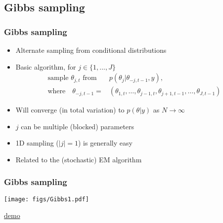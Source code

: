 \documentclass[10pt]{beamer}
\begin{document}
\subsection{Gibbs sampling}

\begin{frame}

\frametitle{Gibbs sampling}

  \begin{itemize}
  \item Alternate sampling from conditional distributions
  \item Basic algorithm, for $j \in \{1,...,J\}$ {
      \begin{align*}
         \text{sample $\theta_{j,t}$ from} \quad & p(\theta_j|\theta_{-j,t-1}, y),\\
      \text{where} \quad 
          \theta_{-j,t-1} = & (\theta_{1,t},\dots,\theta_{j-1,t}, 
          \theta_{j+1,t-1},\dots,\theta_{J,t-1})
      \end{align*}
      }
  \item Will converge (in total variation) to $p(\theta|y)$ as $N\rightarrow\infty$\pause
  \item $j$ can be multiple (blocked) parameters
  \item 1D sampling ($|j|=1$) is generally easy\pause
  \item Related to the (stochastic) EM algorithm
  \end{itemize}
\end{frame}

\begin{frame}

\frametitle{Gibbs sampling}

    \vspace{-.5\baselineskip}
     \begin{center}
       \texttt{[image: figs/Gibbs1.pdf]}
     \end{center}
    \vspace{-.5\baselineskip}
     \begin{center}
       \href{https://github.com/MansMeg/BSDA/blob/main/lectures/L5/figs/gibbs_example.gif}{demo}
     \end{center}
\end{frame}

\end{document}
